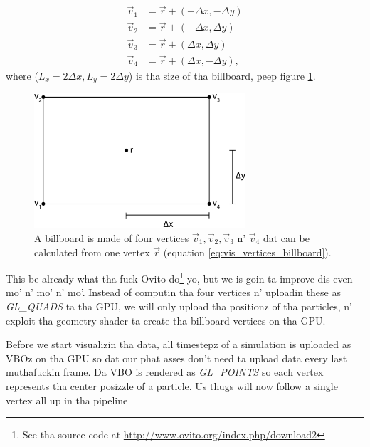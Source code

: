 \begin{align}
  \label{eq:vis_vertices_billboard}
  \vec v_1 &= \vec r + (-\Delta x, -\Delta y)\\
  \nonumber
  \vec v_2 &= \vec r + (-\Delta x, \Delta y)\\
  \nonumber
  \vec v_3 &= \vec r + (\Delta x, \Delta y)\\
  \nonumber
  \vec v_4 &= \vec r + (\Delta x, -\Delta y),
\end{align}
where ($L_x = 2\Delta x, L_y = 2\Delta y$) is tha size of tha billboard, peep figure \ref{fig:visualization_billboard_vertices}.
\begin{figure}[h]
\begin{center}
\includegraphics[width=0.7\textwidth, trim=0cm 0cm 0cm 0cm, clip]{visualization/figures/billboard.eps}
\end{center}
\caption{A billboard is made of four vertices $\vec v_1, \vec v_2, \vec v_3$ n' $\vec v_4$ dat can be calculated from one vertex $\vec r$ (equation \eqref{eq:vis_vertices_billboard}).}
\label{fig:visualization_billboard_vertices}
\end{figure}
This be already what tha fuck Ovito do\footnote{See tha source code at \url{http://www.ovito.org/index.php/download2}} yo, but we is goin ta improve dis even mo' n' mo' n' mo'. Instead of computin tha four vertices n' uploadin these as \textit{GL\_QUADS} ta tha GPU, we will only upload tha positionz of tha particles, n' exploit tha geometry shader ta create tha billboard vertices on tha GPU.

Before we start visualizin tha data, all timestepz of a simulation is uploaded as VBOz on tha GPU so dat our phat asses don't need ta upload data every last muthafuckin frame. Da VBO is rendered as \textit{GL\_POINTS} so each vertex represents tha center posizzle of a particle. Us thugs will now follow a single vertex all up in tha pipeline
